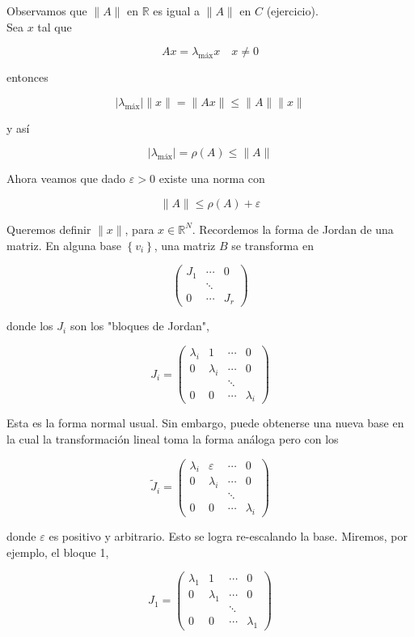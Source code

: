 \documentclass[10pt]{book}
\begin{document}
Observamos que $\|A\|$ en $\mathbb{R}$ es igual a $\|A\|$ en $C$ (ejercicio).\\
Sea $x$ tal que

$$
A x=\lambda_{\operatorname{máx}} x \quad x \neq 0
$$

entonces

$$
\left|\lambda_{\operatorname{máx}}\right|\|x\|=\|A x\| \leq\|A\|\|x\|
$$

y así

$$
\left|\lambda_{\operatorname{máx}}\right|=\rho(A) \leq\|A\|
$$

Ahora veamos que dado $\varepsilon>0$ existe una norma con

$$
\|A\| \leq \rho(A)+\varepsilon
$$

Queremos definir $\|x\|$, para $x \in \mathbb{R}^{N}$. Recordemos la forma de Jordan de una matriz. En alguna base $\left\{v_{i}\right\}$, una matriz $B$ se transforma en

$$
\left(\begin{array}{ccc}
J_{1} & \cdots & 0 \\
& \ddots & \\
0 & \cdots & J_{r}
\end{array}\right)
$$

donde los $J_{i}$ son los "bloques de Jordan",

$$
J_{i}=\left(\begin{array}{cccc}
\lambda_{i} & 1 & \cdots & 0 \\
0 & \lambda_{i} & \cdots & 0 \\
& & \ddots & \\
0 & 0 & \cdots & \lambda_{i}
\end{array}\right)
$$

Esta es la forma normal usual. Sin embargo, puede obtenerse una nueva base en la cual la transformación lineal toma la forma análoga pero con los

$$
\tilde{J}_{i}=\left(\begin{array}{cccc}
\lambda_{i} & \varepsilon & \cdots & 0 \\
0 & \lambda_{i} & \cdots & 0 \\
& & \ddots & \\
0 & 0 & \cdots & \lambda_{i}
\end{array}\right)
$$

donde $\varepsilon$ es positivo y arbitrario. Esto se logra re-escalando la base. Miremos, por ejemplo, el bloque 1,

$$
J_{1}=\left(\begin{array}{cccc}
\lambda_{1} & 1 & \cdots & 0 \\
0 & \lambda_{1} & \cdots & 0 \\
& & \ddots & \\
0 & 0 & \cdots & \lambda_{1}
\end{array}\right)
$$
\end{document}
